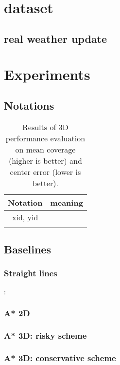 \documentclass{article}
\begin{document}
\section{dataset}
 \subsection{real weather update}

\section{Experiments}
\subsection{Notations}
\begin{table}[t]
\small
   \centering
        \begin{tabu}{@{}cc@{}}\toprule
        [-1pt] 
        Notation                       &   meaning        \\
        \hline
        xid, yid   & \\
        [-1pt] 
        \end{tabu}

    \caption{ {\small
    Results of 3D performance evaluation on mean coverage (higher is better) and center error (lower is better).
     }
          } \label{table_baseline_3d}
\end{table}

\subsection{Baselines}
\subsubsection{Straight lines}:
\subsubsection{A* 2D}
\subsubsection{A* 3D: risky scheme}
\subsubsection{A* 3D: conservative scheme}
\end{document}
